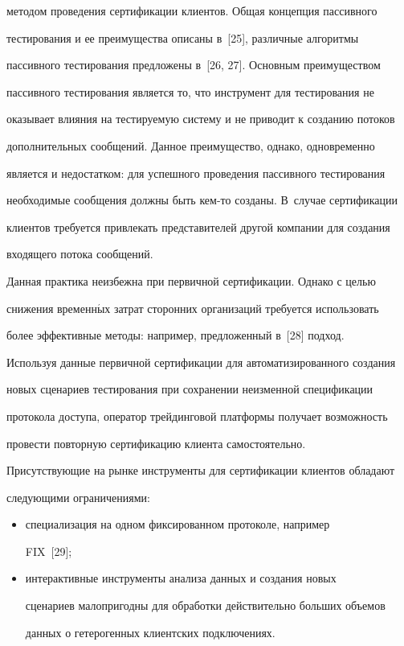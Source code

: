 методом проведения сертификации клиентов. Общая концепция пассивного


тес\-ти\-ро\-ва\-ния и ее преимущества описаны в~[25], различные алгоритмы


пассивного тес\-ти\-ро\-ва\-ния предложены в~[26, 27]. Основным преимуществом


пассивного тестирования является то, что инструмент для тестирования не


оказывает влияния на тестируемую систему и не приводит к созданию потоков


дополнительных сообщений. Данное преимущество, однако, одновременно


является и недостатком: для успешного проведения пассивного тестирования


необходимые сообщения должны быть кем-то созданы. В~случае сертификации


клиентов требуется привлекать представителей другой компании для создания


входящего потока сообщений.





Данная практика неизбежна при первичной сертификации. Однако с \mbox{целью}


снижения временн$\acute{\mbox{ы}}$х затрат сторонних организаций требуется использовать


более эффективные методы: например, предложенный в~[28] подход.


Используя данные первичной сертификации для автоматизированного создания


новых сценариев тестирования при сохранении неизменной спецификации


протокола доступа, оператор трейдинговой платформы получает возможность


провести повторную сертификацию клиента самостоятельно.





Присутствующие на рынке инструменты для сертификации клиентов обладают


следующими ограничениями:


\begin{itemize}


\item специализация на одном фиксированном протоколе, например


FIX~[29];


\item интерактивные инструменты анализа данных и создания новых


сценариев малопригодны для обработки действительно больших объемов


данных о гетерогенных клиентских подключениях.


\end{itemize}





